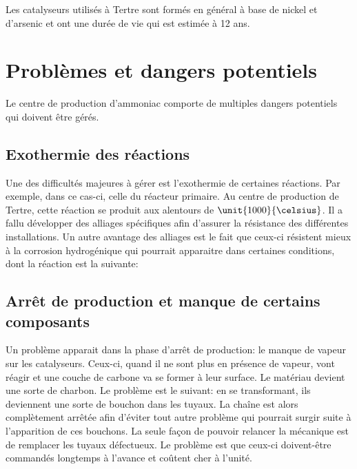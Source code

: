 Les catalyseurs utilisés à Tertre sont formés en général à base de nickel et d'arsenic et ont une durée de vie qui est estimée à 12 ans.

\section*{Problèmes et dangers potentiels}
Le centre de production d'ammoniac comporte de multiples dangers potentiels qui doivent être gérés. 

\subsection*{Exothermie des réactions}
Une des difficultés majeures à gérer est l'exothermie de certaines réactions. Par exemple, dans ce cas-ci, celle du réacteur primaire. Au centre de production de Tertre, cette réaction se produit aux alentours de $\unit{1000}{\celsius}$. Il a fallu développer des alliages spécifiques afin d'assurer la résistance des différentes installations. Un autre avantage des alliages est le fait que ceux-ci résistent mieux à la corrosion hydrogénique qui pourrait apparaitre dans certaines conditions, dont la réaction est la suivante:


\subsection*{Arrêt de production et manque de certains composants}
Un problème apparait dans la phase d'arrêt de production: le manque de vapeur sur les catalyseurs. Ceux-ci, quand il ne sont plus en présence de vapeur, vont réagir et une couche de carbone va se former à leur surface. Le matériau devient une sorte de charbon. Le problème est le suivant: en se transformant, ils deviennent une sorte de bouchon dans les tuyaux. La chaîne est alors complètement arrêtée afin d'éviter tout autre problème qui pourrait surgir suite à l'apparition de ces bouchons. La seule façon de pouvoir relancer la mécanique est de remplacer les tuyaux défectueux. Le problème est que ceux-ci doivent-être commandés longtemps à l'avance et coûtent cher à l'unité.

